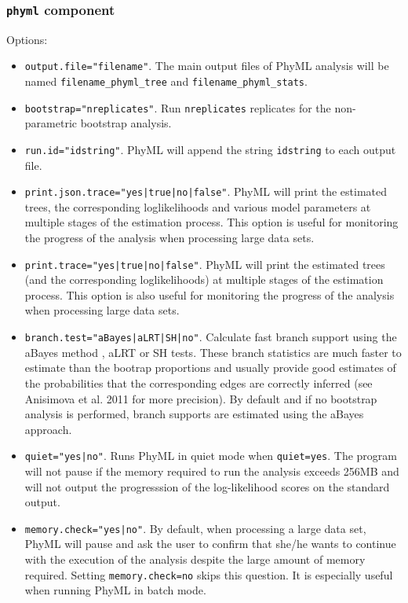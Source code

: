 \documentclass[a4paper,12pt]{article}
\newcommand{\x}[1]{\texttt{#1}}
\begin{document}
\subsubsection{{\tt phyml} component}
Options:
\begin{itemize}
\item \x{output.file="filename"}. The main output files of PhyML analysis will be named
  \x{filename\_phyml\_tree} and \x{filename\_phyml\_stats}.
\item \x{bootstrap="nreplicates"}. Run \x{nreplicates} replicates for the non-parametric bootstrap analysis.
\item \x{run.id="idstring"}. PhyML will append the string \x{idstring} to each output file.
\item \x{print.json.trace="yes|true|no|false"}. PhyML will print the estimated trees, the
  corresponding loglikelihoods and various model parameters at multiple stages of the estimation process. This option is useful
  for monitoring the progress of the analysis when processing large data sets.
\item \x{print.trace="yes|true|no|false"}. PhyML will print the estimated trees (and the
  corresponding loglikelihoods) at multiple stages of the estimation process. This option is also useful
  for monitoring the progress of the analysis when processing large data sets.
\item \x{branch.test="aBayes|aLRT|SH|no"}. Calculate fast branch support using the aBayes method
  \cite{anisimova11}, aLRT \cite{anisimova06} or SH \cite{shimodaira99} tests. These branch
  statistics are much faster to estimate than the bootrap proportions and usually provide good
  estimates of the probabilities that the corresponding edges are correctly inferred (see Anisimova et
  al. 2011 for more precision). By default and if no bootstrap analysis is performed, branch supports
  are estimated using the aBayes approach.
\item \x{quiet="yes|no"}. Runs PhyML in quiet mode when \x{quiet=yes}. The program will not pause if the memory required to run the analysis
exceeds 256MB and will not output the progresssion of the log-likelihood scores on the standard output.
\item \x{memory.check="yes|no"}. By default, when processing a large data set, PhyML will pause and ask the user to confirm that
she/he wants to continue with the execution of the analysis despite the large amount of memory
required. Setting \x{memory.check=no}  skips this question. It is especially useful when running
PhyML in batch mode.



\end{itemize}
\end{document}
